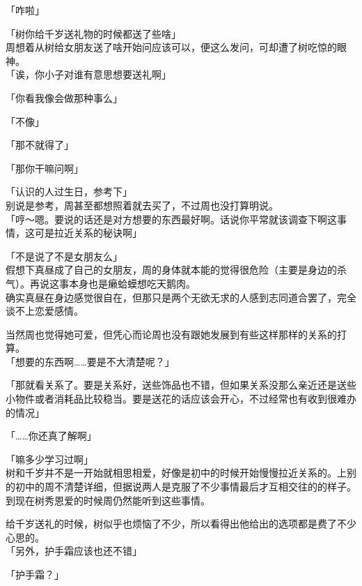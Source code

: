 「咋啦」

「树你给千岁送礼物的时候都送了些啥」\\

周想着从树给女朋友送了啥开始问应该可以，便这么发问，可却遭了树吃惊的眼神。\\

「诶，你小子对谁有意思想要送礼啊」

「你看我像会做那种事么」

「不像」

「那不就得了」

「那你干嘛问啊」

「认识的人过生日，参考下」\\

别说是参考，周甚至都想照着就去买了，不过周也没打算明说。\\

「哼～嗯。要说的话还是对方想要的东西最好啊。话说你平常就该调查下啊这事情，这可是拉近关系的秘诀啊」

「不是说了不是女朋友么」\\

假想下真昼成了自己的女朋友，周的身体就本能的觉得很危险（主要是身边的杀气）。再说这事本身也是癞蛤蟆想吃天鹅肉。\\

确实真昼在身边感觉很自在，但那只是两个无欲无求的人感到志同道合罢了，完全谈不上恋爱感情。

当然周也觉得她可爱，但凭心而论周也没有跟她发展到有些这样那样的关系的打算。\\

「想要的东西啊……要是不大清楚呢？」

「那就看关系了。要是关系好，送些饰品也不错，但如果关系没那么亲近还是送些小物件或者消耗品比较稳当。要是送花的话应该会开心，不过经常也有收到很难办的情况」

「……你还真了解啊」

「嘛多少学习过啊」\\

树和千岁并不是一开始就相思相爱，好像是初中的时候开始慢慢拉近关系的。上别的初中的周不清楚详细，但据说两人是克服了不少事情最后才互相交往的的样子。到现在树秀恩爱的时候周仍然能听到这些事情。

给千岁送礼的时候，树似乎也烦恼了不少，所以看得出他给出的选项都是费了不少心思的。\\

「另外，护手霜应该也还不错」

「护手霜？」\\

